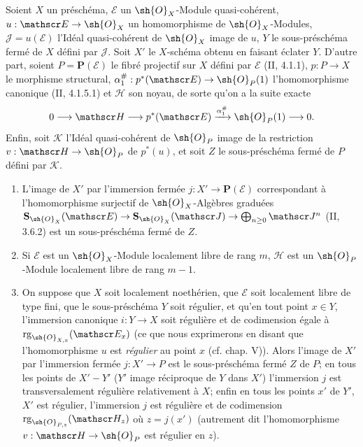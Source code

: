 \begin{proposition}[19.4.11]
\label{IV.19.4.11}
Soient $X$ un préschéma, $\mathscr E$ un $\sh{O}_X$-Module quasi-cohérent, $u:\mathscr E\to\sh{O}_X$ un homomorphisme de $\sh{O}_X$-Modules, $\mathscr J=u(\mathscr E)$ l'Idéal quasi-cohérent de $\sh{O}_X$ image de $u$, $Y$ le sous-préschéma fermé de $X$ défini par $\mathscr J$. Soit $X'$ le $X$-schéma obtenu en faisant éclater $Y$. D'autre part, soient $P=\mathbf P(\mathscr E)$ le fibré projectif sur $X$ défini par $\mathscr E$ (II, 4.1.1), $p:P\to X$ le morphisme structural, $\alpha_1^{\#}:p^*(\mathscr E)\to\sh{O}_P(1)$ l'homomorphisme canonique (II, 4.1.5.1) et $\mathscr H$ son noyau, de sorte qu'on a la suite exacte
\[
  0\longrightarrow\mathscr H\longrightarrow p^*(\mathscr E)\xrightarrow{\alpha_1^{\#}}\sh{O}_P(1)\longrightarrow0.
\]
Enfin, soit $\mathscr K$ l'Idéal quasi-cohérent de $\sh{O}_P$ image de la restriction $v:\mathscr H\to\sh{O}_P$ de $p^*(u)$, et soit $Z$ le sous-préschéma fermé de $P$ défini par $\mathscr K$.


\begin{enumerate}
  \item[(i)] L'image de $X'$ par l'immersion fermée $j:X'\to\mathbf P(\mathscr E)$ correspondant à l'homomorphisme surjectif de $\sh{O}_X$-Algèbres graduées $\mathbf S_{\sh{O}_X}(\mathscr E)\to\mathbf S_{\sh{O}_X}(\mathscr J)\to\bigoplus_{n\geq0}\mathscr J^n$ (II, 3.6.2) est un sous-préschéma fermé de $Z$.
  \item[(ii)] Si $\mathscr E$ est un $\sh{O}_X$-Module localement libre de rang $m$, $\mathscr H$ est un $\sh{O}_P$-Module localement libre de rang $m-1$.
  \item[(iii)] On suppose que $X$ soit localement noethérien, que $\mathscr E$ soit localement libre de type fini, que le sous-préschéma $Y$ soit régulier, et qu'en tout point $x\in Y$, l'immersion canonique $i:Y\to X$ soit régulière et de codimension égale à $\operatorname{rg}_{\sh{O}_{X,x}}(\mathscr E_x)$ (ce que nous exprimerons en disant que l'homomorphisme $u$ est \emph{régulier} au point $x$ (cf. chap. V)). Alors l'image de $X'$ par l'immersion fermée $j:X'\to P$ est le sous-préschéma fermé $Z$ de $P$; en tous les points de $X'-Y'$ ($Y'$ image réciproque de $Y$ dans $X'$) l'immersion $j$ est transversalement régulière relativement à $X$; enfin en tous les points $x'$ de $Y'$, $X'$ est régulier, l'immersion $j$ est régulière et de codimension $\operatorname{rg}_{\sh{O}_{P,z}}(\mathscr H_z)$ où $z=j(x')$ (autrement dit l'homomorphisme $v:\mathscr H\to\sh{O}_P$ est régulier en $z$).
\end{enumerate}
\end{proposition}

